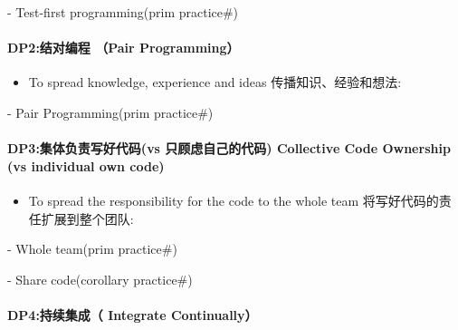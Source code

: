 \documentclass[]{article}
\providecommand{\tightlist}{%
  \setlength{\itemsep}{0pt}\setlength{\parskip}{0pt}}
\let\oldparagraph\paragraph
\renewcommand{\paragraph}[1]{\oldparagraph{#1}\mbox{}}
\begin{document}
\begin{description}
\tightlist
\item[]
- Test-first programming(prim practice\#)
\end{description}

\hypertarget{dp2ux7ed3ux5bf9ux7f16ux7a0b-pair-programming}{%
\paragraph{DP2:结对编程 （Pair
Programming）}\label{dp2ux7ed3ux5bf9ux7f16ux7a0b-pair-programming}}

\begin{itemize}
\tightlist
\item
  To spread knowledge, experience and ideas 传播知识、经验和想法:\\
\end{itemize}

\begin{description}
\tightlist
\item[]
- Pair Programming(prim practice\#)
\end{description}

\hypertarget{dp3ux96c6ux4f53ux8d1fux8d23ux5199ux597dux4ee3ux7801vs-ux53eaux987eux8651ux81eaux5df1ux7684ux4ee3ux7801-collective-code-ownership-vs-individual-own-code}{%
\paragraph{DP3:集体负责写好代码(vs 只顾虑自己的代码) Collective Code
Ownership (vs individual own
code)}\label{dp3ux96c6ux4f53ux8d1fux8d23ux5199ux597dux4ee3ux7801vs-ux53eaux987eux8651ux81eaux5df1ux7684ux4ee3ux7801-collective-code-ownership-vs-individual-own-code}}

\begin{itemize}
\tightlist
\item
  To spread the responsibility for the code to the whole team
  将写好代码的责任扩展到整个团队:\\
\end{itemize}

\begin{description}
\tightlist
\item[]
- Whole team(prim practice\#)

- Share code(corollary practice\#)
\end{description}

\hypertarget{dp4ux6301ux7eedux96c6ux6210-integrate-continually}{%
\paragraph{DP4:持续集成（ Integrate
Continually）}\label{dp4ux6301ux7eedux96c6ux6210-integrate-continually}}
\end{document}
